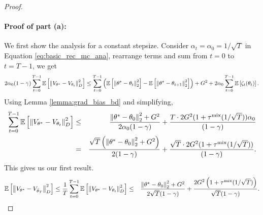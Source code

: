 \documentclass{colt2018} %
\DeclareMathOperator*{\mix}{mix}
\begin{document}
\begin{proof}
\paragraph{Proof of part (a):} We first show the analysis for a constant stepsize. Consider $\alpha_t = \alpha_0 = 1/\sqrt{T}$ in Equation \eqref{eq:basic_rec_mc_ana}, rearrange terms and sum from $t=0$ to $t=T-1$, we get
\begin{eqnarray*}
2 \alpha_0 (1-\gamma) \sum_{t=0}^{T-1} \mathbb{E}\left[\norm{V_{\theta^*} - V_{\theta_t}}^2_{D} \right] \leq \sum_{t=0}^{T-1} \left( \mathbb{E} \left[ \norm{\theta^* - \theta_t}_2^2 \right] - \mathbb{E}\left[ \norm{\theta^* - \theta_{t+1}}_2^2 \right] \right) + G^2 
+ 2\alpha_0 \sum_{t=0}^{T-1} \mathbb{E}\left[ \zeta_t(\theta_t) \right]. 
\end{eqnarray*}
Using Lemma \ref{lemma:grad_bias_bd} and simplifying, 
\begin{eqnarray*}
\sum_{t=0}^{T-1} \mathbb{E}\left[\norm{V_{\theta^*} - V_{\theta_t}}^2_{D} \right] &\leq& 
\frac{\norm{\theta^* - \theta_0}_2^2 + G^2}{2\alpha_0 (1-\gamma)} + \frac{T \cdot 2G^2 (1 + \tau^{\mix}(1/\sqrt{T})) \alpha_0}{(1-\gamma)}\\
&=& \frac{\sqrt{T}\left(\norm{\theta^* - \theta_0}_2^2 + G^2\right)}{2(1-\gamma)} +  \frac{\sqrt{T} \cdot 2G^2 (1 + \tau^{\mix}(1/\sqrt{T}))}{(1-\gamma)}. \label{eq:mc_part_a_rec} 
\end{eqnarray*}
This gives us our first result. 
\begin{eqnarray*}
\mathbb{E}\left[\norm{V_{\theta^*} - V_{\bar{\theta}_T}}^2_{D}\right] \leq \frac{1}{T} \sum_{t=0}^{T-1} \mathbb{E}\left[\norm{V_{\theta^*} - V_{\theta_t}}^2_{D}\right] &\leq& \frac{\norm{\theta^* - \theta_0}_2^2 + G^2}{2\sqrt{T}(1-\gamma)} + \frac{2G^2 \left(1+\tau^{\mix}(1/\sqrt{T})\right)}{\sqrt{T} (1-\gamma)}.
\end{eqnarray*}

\end{proof}
\end{document}
